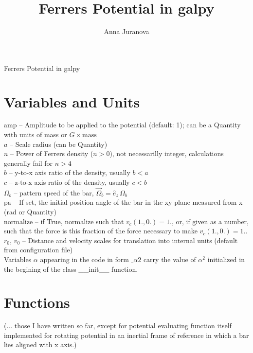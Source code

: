 \documentclass[a4paper,11pt]{article}
\author{Anna Juranova}
\title{Ferrers Potential in galpy}
\begin{document}
	
	\begin{center}
		\huge{Ferrers Potential in galpy}\\
	\end{center}

	\section{Variables and Units}
           $ \mathrm{amp} $ -- Amplitude to be applied to the potential (default: 1); can be a Quantity with units of mass or $ G \times \mathrm{mass} $\\
           $ a $ -- Scale radius (can be Quantity)\\
           $ n $ -- Power of Ferrers density ($ n > 0 $), not necessarilly integer, calculations generally fail for $ n > 4 $\\
           $ b $ -- y-to-x axis ratio of the density, usually $ b < a $\\
           $ c $ -- z-to-x axis ratio of the density, usually $ c < b $\\
           $ \Omega_b $ -- pattern speed of the bar, $ \vec{\Omega}_b = \hat{e}_z\,\Omega_b $\\
           $ \mathrm{pa} $ -- If set, the initial position angle of the bar in the xy plane measured from x (rad or Quantity)\\
           normalize -- if True, normalize such that $ v_c(1.,0.)=1. $, or, if given as a number, such that the force is this fraction of the force necessary to make $ v_c(1.,0.)=1. $.\\
           $ r_0 $, $ v_0 $ -- Distance and velocity scales for translation into internal units (default from configuration file)\\
           Variables $ \alpha $	appearing in the code in form $ \_\alpha2 $ carry the value of $ \alpha^2 $ initialized in the begining of the class \_\_init\_\_ function.

	\section{Functions}
	(... those I have written so far, except for potential evaluating function itself implemented for rotating potential in an inertial frame of reference in which a bar lies aligned with x axis.)
		 
\end{document}
